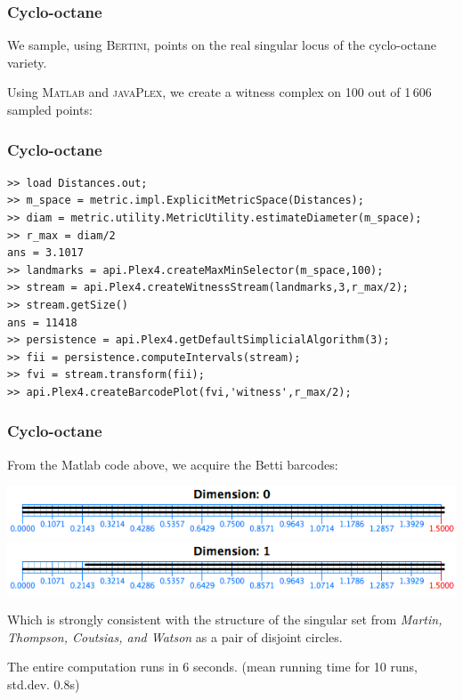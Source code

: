 \documentclass{beamer}
\newcommand\javaPlex{\textsc{javaPlex}\xspace}
\begin{document}
\begin{frame}
  \frametitle{Cyclo-octane}
  We sample, using \textsc{Bertini}, points on the real singular locus of the cyclo-octane variety.

  Using \textsc{Matlab} and \javaPlex, we create a witness complex on 100 out of 1\,606 sampled points:
\end{frame}

\begin{frame}[fragile]
  \frametitle{Cyclo-octane}
{\fontsize{9pt}{14pt}
\begin{verbatim}
>> load Distances.out;
>> m_space = metric.impl.ExplicitMetricSpace(Distances);
>> diam = metric.utility.MetricUtility.estimateDiameter(m_space);
>> r_max = diam/2
ans = 3.1017
>> landmarks = api.Plex4.createMaxMinSelector(m_space,100);
>> stream = api.Plex4.createWitnessStream(landmarks,3,r_max/2);
>> stream.getSize()
ans = 11418
>> persistence = api.Plex4.getDefaultSimplicialAlgorithm(3);
>> fii = persistence.computeIntervals(stream);
>> fvi = stream.transform(fii);
>> api.Plex4.createBarcodePlot(fvi,'witness',r_max/2);
\end{verbatim}
}
\end{frame}

\begin{frame}
  \frametitle{Cyclo-octane}
  From the Matlab code above, we acquire the Betti barcodes:

  \noindent\includegraphics[width=\textwidth]{witness_0} \\
  \noindent\includegraphics[width=\textwidth]{witness_1} 

  Which is strongly consistent with the structure of the singular set from \textit{Martin, Thompson, Coutsias, and Watson} as a pair of disjoint circles.

  The entire computation runs in 6 seconds. (mean running time for 10 runs, std.dev. 0.8s)
\end{frame}
\end{document}
